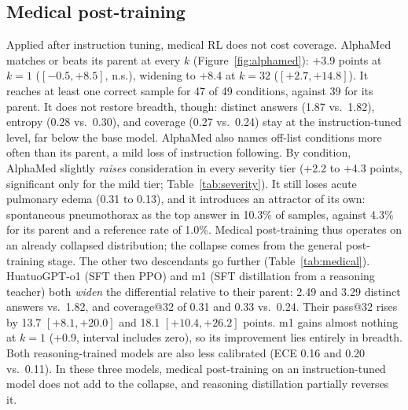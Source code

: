 \documentclass[wcp]{jmlr}
\begin{document}
\subsection{Medical post-training}\label{sec:medical}
Applied after instruction tuning, medical RL does not cost coverage. AlphaMed matches or beats its parent at every $k$ (Figure~\ref{fig:alphamed}): +3.9 points at $k{=}1$ ($[-0.5,+8.5]$, n.s.), widening to +8.4 at $k{=}32$ ($[+2.7,+14.8]$). It reaches at least one correct sample for 47 of 49 conditions, against 39 for its parent.
It does not restore breadth, though: distinct answers (1.87 vs.\ 1.82), entropy (0.28 vs.\ 0.30), and coverage (0.27 vs.\ 0.24) stay at the instruction-tuned level, far below the base model.
AlphaMed also names off-list conditions more often than its parent, a mild loss of instruction following.
By condition, AlphaMed slightly \emph{raises} consideration in every severity tier (+2.2 to +4.3 points, significant only for the mild tier; Table~\ref{tab:severity}). It still loses acute pulmonary edema (0.31 to 0.13), and it introduces an attractor of its own: spontaneous pneumothorax as the top answer in 10.3\% of samples, against 4.3\% for its parent and a reference rate of 1.0\%.
Medical post-training thus operates on an already collapsed distribution; the collapse comes from the general post-training stage.
The other two descendants go further (Table~\ref{tab:medical}). HuatuoGPT-o1 (SFT then PPO) and m1 (SFT distillation from a reasoning teacher) both \emph{widen} the differential relative to their parent: 2.49 and 3.29 distinct answers vs.\ 1.82, and coverage@32 of 0.31 and 0.33 vs.\ 0.24. Their pass@32 rises by 13.7 $[+8.1,+20.0]$ and 18.1 $[+10.4,+26.2]$ points. m1 gains almost nothing at $k{=}1$ (+0.9, interval includes zero), so its improvement lies entirely in breadth. Both reasoning-trained models are also less calibrated (ECE 0.16 and 0.20 vs.\ 0.11). In these three models, medical post-training on an instruction-tuned model does not add to the collapse, and reasoning distillation partially reverses it.
\end{document}
